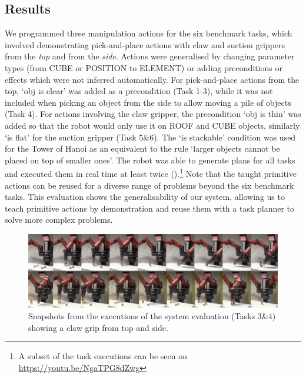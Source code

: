 \subsection{Results}
We programmed three manipulation actions for the six benchmark tasks, which involved demonstrating pick-and-place actions with claw and suction grippers from the \textit{top} and from the \textit{side}.
Actions were generalised by changing parameter types (\eg from CUBE or POSITION to ELEMENT) or adding preconditions or effects which were not inferred automatically.
For pick-and-place actions from the top, `obj is clear' was added as a precondition (Task 1-3), while it was not included when picking an object from the side to allow moving a pile of objects (Task 4).
For actions involving the claw gripper, the precondition `obj is thin' was added so that the robot would only use it on ROOF and CUBE objects, similarly `is flat' for the suction gripper (Task 5\&6).
The `is stackable' condition was used for the Tower of Hanoi as an equivalent to the rule `larger objects cannot be placed on top of smaller ones'.
The robot was able to generate plans for all tasks and executed them in real time at least twice ().\footnote{A subset of the task executions can be seen on \url{https://youtu.be/NgaTPG8dZwg}}
Note that the taught primitive actions can be reused for a diverse range of problems beyond the six benchmark tasks.
This evaluation shows the generalisability of our system, allowing us to teach primitive actions by demonstration and reuse them with a task planner to solve more complex problems.

\begin{figure}[h]
	\centering
	\includegraphics[width=\linewidth]{figures/filmstrip.png}
	\caption{Snapshots from the executions of the system evaluation (Tasks 3\&4) showing a claw grip from top and side.}
	\label{fig:filmstrip}
\end{figure}
